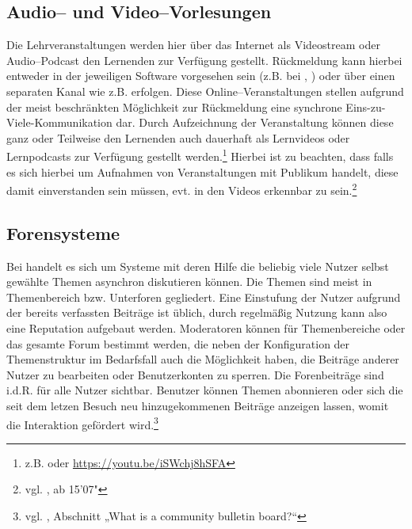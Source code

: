 \subsection{Audio– und Video–Vorlesungen} %
\label{sub:audio_und_video_vorlesungen}
Die Lehrveranstaltungen werden hier über das Internet als Videostream oder Audio–Podcast den Lernenden zur Verfügung gestellt. Rückmeldung kann hierbei entweder in der jeweiligen Software vorgesehen sein (z.B. bei , ) oder über einen separaten Kanal wie z.B.  erfolgen. Diese Online–Veranstaltungen stellen aufgrund der meist beschränkten Möglichkeit zur Rückmeldung eine synchrone Eins-zu-Viele-Kommunikation dar. Durch Aufzeichnung der Veranstaltung können diese ganz oder Teilweise den Lernenden auch dauerhaft als Lernvideos oder Lernpodcasts zur Verfügung gestellt werden.\footnote{z.B.  oder \url{https://youtu.be/iSWchj8hSFA}} Hierbei ist zu beachten, dass falls es sich hierbei um Aufnahmen von Veranstaltungen mit Publikum handelt, diese damit einverstanden sein müssen, evt. in den Videos erkennbar zu sein.\footnote{vgl. \cite{cs50}, ab 15'07" }

\subsection{Forensysteme} %
\label{sub:forensysteme}
Bei  handelt es sich um Systeme mit deren Hilfe die beliebig viele Nutzer selbst gewählte Themen asynchron diskutieren können. Die Themen sind meist in Themenbereich bzw. Unterforen gegliedert. Eine Einstufung der Nutzer aufgrund der bereits verfassten Beiträge ist üblich, durch regelmäßig Nutzung kann also eine Reputation aufgebaut werden. Moderatoren können für Themenbereiche oder das gesamte Forum bestimmt werden, die neben der Konfiguration der Themenstruktur im Bedarfsfall auch die Möglichkeit haben, die Beiträge anderer Nutzer zu bearbeiten oder Benutzerkonten zu sperren. Die Forenbeiträge sind i.d.R. für alle Nutzer sichtbar. Benutzer können Themen abonnieren oder sich die seit dem letzen Besuch neu hinzugekommenen Beiträge anzeigen lassen, womit die Interaktion gefördert wird.\footnote{vgl. \cite{vbulletin}, Abschnitt „What is a community bulletin board?“}

